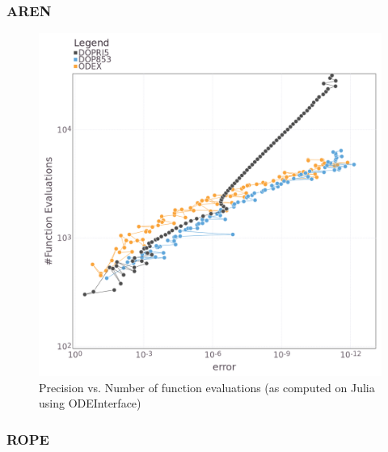 \documentclass[notitlepage,12pt]{article}
\begin{document}
\subsubsection{AREN}
\label{sub:aren}

\begin{figure}[H]
\centering
\includegraphics[scale=0.4]{../ImagesAndPDFs/Plots/ArenstorfPrecisionTest.png}
\caption{Precision vs. Number of function evaluations (as computed on Julia using ODEInterface)}
\label{fig:arenJulia}
\end{figure}

\subsubsection{ROPE}
\label{sub:rope}
\end{document}
